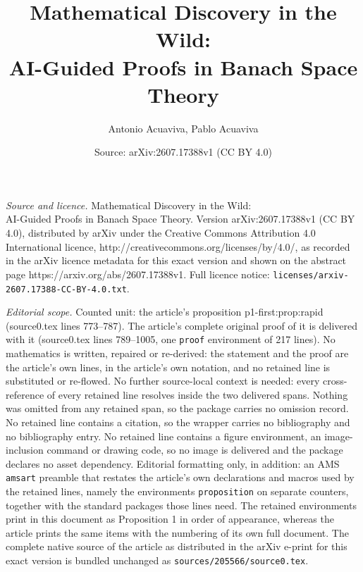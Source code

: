 \documentclass[10pt,a4paper]{amsart}
\title{Mathematical Discovery in the Wild:\\ AI-Guided Proofs in Banach Space Theory}
\author{Antonio Acuaviva, Pablo Acuaviva}
\date{Source: arXiv:2607.17388v1 (CC BY 4.0)}
\begin{document}
\maketitle

\noindent\emph{Source and licence.} Mathematical Discovery in the Wild:\\ AI-Guided Proofs in Banach Space Theory. Version arXiv:2607.17388v1 (CC BY 4.0), distributed by arXiv under the Creative Commons Attribution 4.0 International licence, http://creativecommons.org/licenses/by/4.0/, as recorded in the arXiv licence metadata for this exact version and shown on the abstract page https://arxiv.org/abs/2607.17388v1. Full licence notice: \texttt{licenses/arxiv-2607.17388-CC-BY-4.0.txt}.\par\smallskip

\noindent\textit{Editorial scope.} Counted unit: the article's proposition p1-first:prop:rapid (source0.tex lines 773--787). The article's complete original proof of it is delivered with it (source0.tex lines 789--1005, one \texttt{proof} environment of 217 lines). No mathematics is written, repaired or re-derived: the statement and the proof are the article's own lines, in the article's own notation, and no retained line is substituted or re-flowed.  No further source-local context is needed: every cross-reference of every retained line resolves inside the two delivered spans.  Nothing was omitted from any retained span, so the package carries no omission record.  No retained line contains a citation, so the wrapper carries no bibliography and no bibliography entry.  No retained line contains a figure environment, an image-inclusion command or drawing code, so no image is delivered and the package declares no asset dependency.  Editorial formatting only, in addition: an AMS \texttt{amsart} preamble that restates the article's own declarations and macros used by the retained lines, namely the environments \texttt{proposition} on separate counters, together with the standard packages those lines need.  The retained environments print in this document as Proposition 1 in order of appearance, whereas the article prints the same items with the numbering of its own full document.  The complete native source of the article as distributed in the arXiv e-print for this exact version is bundled unchanged as \texttt{sources/205566/source0.tex}.
\end{document}
